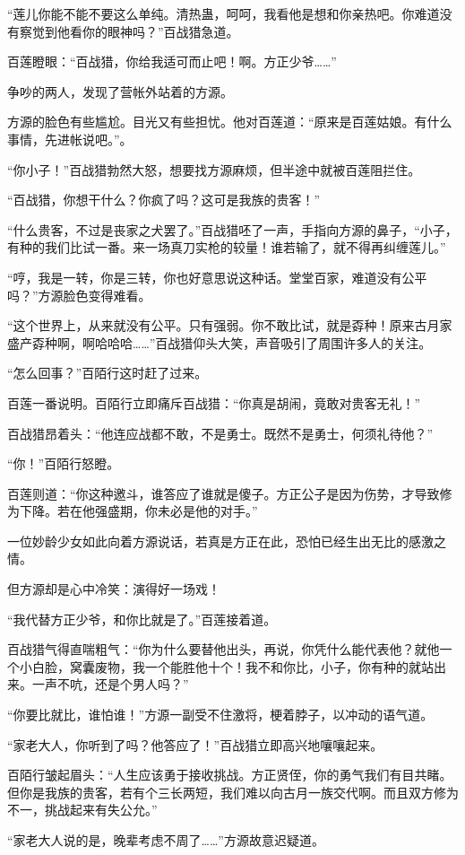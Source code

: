 \begin{this_body}
“莲儿你能不能不要这么单纯。清热蛊，呵呵，我看他是想和你亲热吧。你难道没有察觉到他看你的眼神吗？”百战猎急道。

百莲瞪眼：“百战猎，你给我适可而止吧！啊。方正少爷……”

争吵的两人，发现了营帐外站着的方源。

方源的脸色有些尴尬。目光又有些担忧。他对百莲道：“原来是百莲姑娘。有什么事情，先进帐说吧。”。

“你小子！”百战猎勃然大怒，想要找方源麻烦，但半途中就被百莲阻拦住。

“百战猎，你想干什么？你疯了吗？这可是我族的贵客！”

“什么贵客，不过是丧家之犬罢了。”百战猎呸了一声，手指向方源的鼻子，“小子，有种的我们比试一番。来一场真刀实枪的较量！谁若输了，就不得再纠缠莲儿。”

“哼，我是一转，你是三转，你也好意思说这种话。堂堂百家，难道没有公平吗？”方源脸色变得难看。

“这个世界上，从来就没有公平。只有强弱。你不敢比试，就是孬种！原来古月家盛产孬种啊，啊哈哈哈……”百战猎仰头大笑，声音吸引了周围许多人的关注。

“怎么回事？”百陌行这时赶了过来。

百莲一番说明。百陌行立即痛斥百战猎：“你真是胡闹，竟敢对贵客无礼！”

百战猎昂着头：“他连应战都不敢，不是勇士。既然不是勇士，何须礼待他？”

“你！”百陌行怒瞪。

百莲则道：“你这种邀斗，谁答应了谁就是傻子。方正公子是因为伤势，才导致修为下降。若在他强盛期，你未必是他的对手。”

一位妙龄少女如此向着方源说话，若真是方正在此，恐怕已经生出无比的感激之情。

但方源却是心中冷笑：演得好一场戏！

“我代替方正少爷，和你比就是了。”百莲接着道。

百战猎气得直喘粗气：“你为什么要替他出头，再说，你凭什么能代表他？就他一个小白脸，窝囊废物，我一个能胜他十个！我不和你比，小子，你有种的就站出来。一声不吭，还是个男人吗？”

“你要比就比，谁怕谁！”方源一副受不住激将，梗着脖子，以冲动的语气道。

“家老大人，你听到了吗？他答应了！”百战猎立即高兴地嚷嚷起来。

百陌行皱起眉头：“人生应该勇于接收挑战。方正贤侄，你的勇气我们有目共睹。但你是我族的贵客，若有个三长两短，我们难以向古月一族交代啊。而且双方修为不一，挑战起来有失公允。”

“家老大人说的是，晚辈考虑不周了……”方源故意迟疑道。


\end{this_body}
